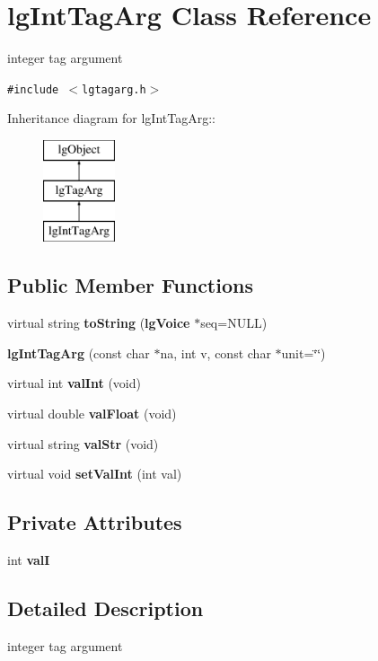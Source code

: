 \section{lg\-Int\-Tag\-Arg Class Reference}
\label{classlgIntTagArg}
integer tag argument  


{\tt \#include $<$lgtagarg.h$>$}

Inheritance diagram for lg\-Int\-Tag\-Arg::\begin{figure}[H]
\begin{center}
\leavevmode
\includegraphics[height=3cm]{classlgIntTagArg}
\end{center}
\end{figure}
\subsection*{Public Member Functions}
\begin{CompactItemize}
\item 
virtual string {\bf to\-String} ({\bf lg\-Voice} $\ast$seq=NULL)
\item 
{\bf lg\-Int\-Tag\-Arg} (const char $\ast$na, int v, const char $\ast$unit=\char`\"{}\char`\"{})
\item 
virtual int {\bf val\-Int} (void)
\item 
virtual double {\bf val\-Float} (void)
\item 
virtual string {\bf val\-Str} (void)
\item 
virtual void {\bf set\-Val\-Int} (int val)
\end{CompactItemize}
\subsection*{Private Attributes}
\begin{CompactItemize}
\item 
int {\bf val\-I}
\end{CompactItemize}


\subsection{Detailed Description}
integer tag argument 



